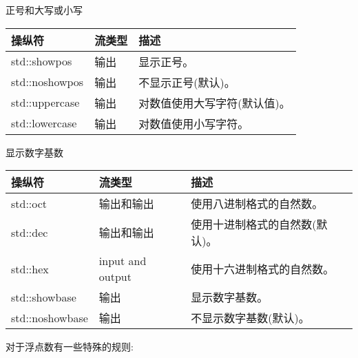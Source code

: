 \begin{center}
正号和大写或小写
\end{center}

\begin{longtable}[c]{|l|l|l|}
\hline
\textbf{操纵符} & \textbf{流类型} & \textbf{描述}                                    \\ \hline
\endfirsthead
%
\endhead
%
std::showpos         & 输出               & 显示正号。                                \\ \hline
std::noshowpos       & 输出               & 不显示正号(默认)。                \\ \hline
std::uppercase       & 输出               & 对数值使用大写字符(默认值)。 \\ \hline
std::lowercase       & 输出               & 对数值使用小写字符。          \\ \hline
\end{longtable}


\begin{center}
显示数字基数
\end{center}

\begin{longtable}[c]{|l|l|l|}
\hline
\textbf{操纵符} & \textbf{流类型} & \textbf{描述}                             \\ \hline
\endfirsthead
%
\endhead
%
std::oct             & 输出和输出     & 使用八进制格式的自然数。            \\ \hline
std::dec             & 输出和输出     & 使用十进制格式的自然数(默认)。 \\ \hline
std::hex             & input and output     & 使用十六进制格式的自然数。      \\ \hline
std::showbase        & 输出               & 显示数字基数。                       \\ \hline
std::noshowbase      & 输出               & 不显示数字基数(默认)。       \\ \hline
\end{longtable}

对于浮点数有一些特殊的规则:


